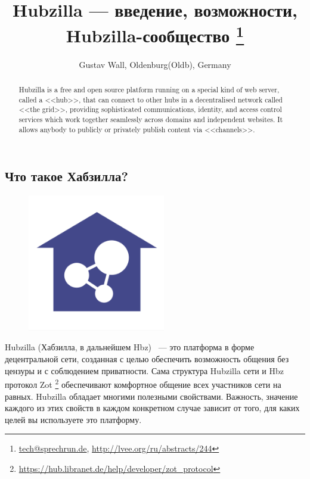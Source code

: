 \documentclass[10pt, a5paper]{article}
\begin{document}
\title{Hubzilla --- введение, возможности, Hubzilla-сообщество \footnote{\url{tech@sprechrun.de}, \url{http://lvee.org/ru/abstracts/244}}}
\author{Gustav Wall, Oldenburg(Oldb), Germany}
\maketitle
\begin{abstract}
Hubzilla is a free and open source platform running on a special kind of web server, called a <<hub>>, that can connect to other hubs in a decentralised network called <<the grid>>, providing sophisticated communications, identity, and access control services which work together seamlessly across domains and independent websites. It allows anybody to publicly or privately publish content via <<channels>>.
\end{abstract}
\subsection*{Что такое Хабзилла?}

\begin{center}
\begin{figure}[h!]
  \centering
  \includegraphics[width=6cm]{Wall1.png}
  
  \label{Wall_1}
\end{figure}
\end{center}

Hubzilla (Хабзилла, в дальнейшем Hbz) ~--- это платформа в форме децентральной сети, созданная с целью обеспечить возможность общения без цензуры и с соблюдением приватности. Сама структура Hubzilla сети и Hbz протокол Zot \footnote{\url{https://hub.libranet.de/help/developer/zot_protocol}} обеспечивают комфортное общение всех участников сети на равных. Hubzilla обладает многими полезными свойствами. Важность, значение каждого из этих свойств в каждом конкретном случае зависит от того, для каких целей вы используете это платформу.
\end{document}
